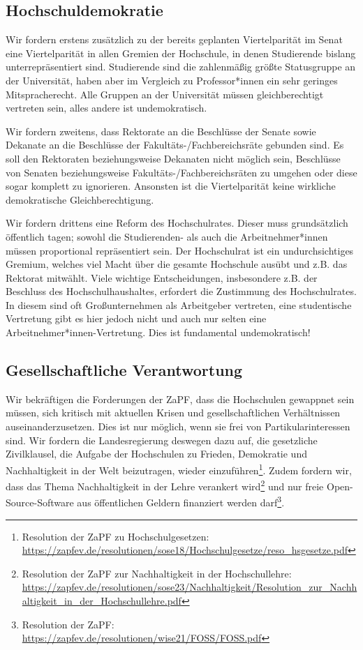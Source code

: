 \documentclass[DIV=calc]{scrartcl}
\begin{document}
\subsection*{Hochschuldemokratie}
Wir fordern erstens zusätzlich zu der bereits geplanten Viertelparität im Senat eine Viertelparität in allen Gremien der Hochschule, in denen Studierende bislang unterrepräsentiert sind. Studierende sind die zahlenmäßig größte Statusgruppe an der Universität, haben aber im Vergleich zu Professor*innen ein sehr geringes Mitspracherecht. Alle Gruppen an der Universität müssen gleichberechtigt vertreten sein, alles andere ist undemokratisch.

Wir fordern zweitens, dass Rektorate an die Beschlüsse der Senate sowie Dekanate an die Beschlüsse der Fakultäts-/Fachbereichsräte gebunden sind. Es soll den Rektoraten beziehungsweise Dekanaten nicht möglich sein, Beschlüsse von Senaten beziehungsweise Fakultäts-/Fachbereichsräten zu umgehen oder diese sogar komplett zu ignorieren. Ansonsten ist die Viertelparität keine wirkliche demokratische Gleichberechtigung.

Wir fordern drittens eine Reform des Hochschulrates. Dieser muss grundsätzlich öffentlich tagen; sowohl die Studierenden- als auch die Arbeitnehmer*innen müssen proportional repräsentiert sein. Der Hochschulrat ist ein undurchsichtiges Gremium, welches viel Macht über die gesamte Hochschule ausübt und z.B. das Rektorat mitwählt. Viele wichtige Entscheidungen, insbesondere z.B. der Beschluss des Hochschulhaushaltes, erfordert die Zustimmung des Hochschulrates. In diesem sind oft Großunternehmen als Arbeitgeber vertreten, eine studentische Vertretung gibt es hier jedoch nicht und auch nur selten eine Arbeitnehmer*innen-Vertretung. Dies ist fundamental undemokratisch!

\subsection*{Gesellschaftliche Verantwortung}
Wir bekräftigen die Forderungen der ZaPF, dass die Hochschulen gewappnet sein müssen, sich kritisch mit aktuellen Krisen und gesellschaftlichen Verhältnissen auseinanderzusetzen. Dies ist nur möglich, wenn sie frei von Partikularinteressen sind. Wir fordern die Landesregierung deswegen dazu auf, die gesetzliche Zivilklausel, die Aufgabe der Hochschulen zu Frieden, Demokratie und Nachhaltigkeit in der Welt beizutragen, wieder einzuführen\footnote{Resolution der ZaPF zu Hochschulgesetzen: \url{https://zapfev.de/resolutionen/sose18/Hochschulgesetze/reso\_hsgesetze.pdf}}. Zudem fordern wir, dass das Thema Nachhaltigkeit in der Lehre verankert wird\footnote{Resolution der ZaPF zur Nachhaltigkeit in der Hochschullehre: \url{https://zapfev.de/resolutionen/sose23/Nachhaltigkeit/Resolution\_zur\_Nachhaltigkeit\_in\_der\_Hochschullehre.pdf}} und nur freie Open-Source-Software aus öffentlichen Geldern finanziert werden darf\footnote{Resolution der ZaPF: \url{https://zapfev.de/resolutionen/wise21/FOSS/FOSS.pdf}}.
\end{document}
